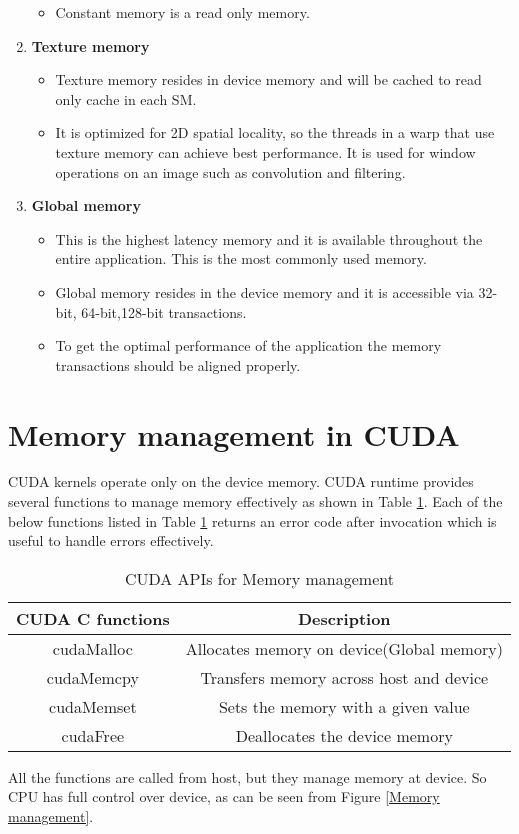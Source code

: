 \begin{enumerate}
\begin{itemize}
\item Constant memory is a read only memory.
\end{itemize}
\item \textbf{Texture memory}
\begin{itemize}
\item Texture memory resides in device memory and will be cached to read only cache in each SM.
\item It is optimized for 2D spatial locality, so the threads in a warp that use texture memory can achieve best performance. It is used for window operations on an image such as convolution and filtering.
\end{itemize}
\item \textbf{Global memory}
\begin{itemize}
\item This is the highest latency memory and it is available throughout the entire application. This is the most commonly used memory.
\item Global memory resides in the device memory and it is accessible via 32-bit, 64-bit,128-bit transactions.
\item To get the optimal performance of the application the memory transactions should be aligned properly.
\end{itemize}
\end{enumerate}
\section{Memory management in CUDA}
CUDA kernels operate only on the device memory. CUDA runtime provides several functions to manage memory effectively as shown in Table  \ref{Memory management in CUDA}. Each of the below functions listed in Table \ref{Memory management in CUDA} returns an error code after invocation which is useful to handle errors effectively.
\begin{table}[h!]
\centering
\begin{tabular}{ |c|c| }
\hline
\textbf{CUDA C functions} & \textbf{Description} \\
\hline
cudaMalloc & Allocates memory on device(Global memory) \\  
\hline
cudaMemcpy & Transfers memory across host and device \\	
\hline
cudaMemset & Sets the memory with a given value \\
\hline
cudaFree & Deallocates the device memory \\
\hline
\end{tabular}
\caption{CUDA APIs for Memory management}
\label{Memory management in CUDA}
\end{table}
All the functions are called from host, but they manage memory at device. So CPU has full control over device, as can be seen from Figure \ref{Memory management}.

